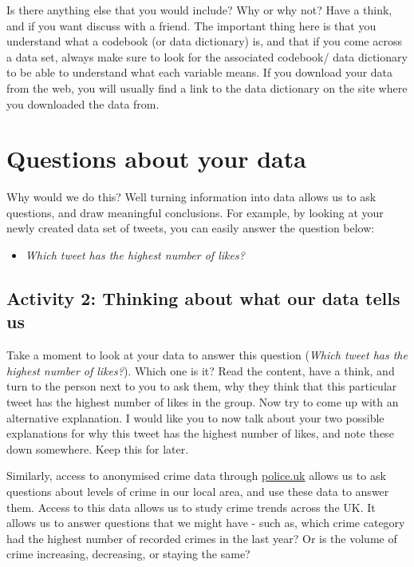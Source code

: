 \documentclass[]{book}
\providecommand{\tightlist}{%
  \setlength{\itemsep}{0pt}\setlength{\parskip}{0pt}}
\theoremstyle{definition}
\theoremstyle{definition}
\theoremstyle{definition}
\theoremstyle{remark}
\begin{document}
Is there anything else that you would include? Why or why not? Have a
think, and if you want discuss with a friend. The important thing here
is that you understand what a codebook (or data dictionary) is, and that
if you come across a data set, always make sure to look for the
associated codebook/ data dictionary to be able to understand what each
variable means. If you download your data from the web, you will usually
find a link to the data dictionary on the site where you downloaded the
data from.

\hypertarget{questions-about-your-data}{%
\section{Questions about your data}\label{questions-about-your-data}}

Why would we do this? Well turning information into data allows us to
ask questions, and draw meaningful conclusions. For example, by looking
at your newly created data set of tweets, you can easily answer the
question below:

\begin{itemize}
\tightlist
\item
  \emph{Which tweet has the highest number of likes?}
\end{itemize}

\hypertarget{activity-2-thinking-about-what-our-data-tells-us}{%
\subsection{Activity 2: Thinking about what our data tells
us}\label{activity-2-thinking-about-what-our-data-tells-us}}

Take a moment to look at your data to answer this question (\emph{Which
tweet has the highest number of likes?}). Which one is it? Read the
content, have a think, and turn to the person next to you to ask them,
why they think that this particular tweet has the highest number of
likes in the group. Now try to come up with an alternative explanation.
I would like you to now talk about your two possible explanations for
why this tweet has the highest number of likes, and note these down
somewhere. Keep this for later.

Similarly, access to anonymised crime data through
\href{www.police.uk}{police.uk} allows us to ask questions about levels
of crime in our local area, and use these data to answer them. Access to
this data allows us to study crime trends across the UK. It allows us to
answer questions that we might have - such as, which crime category had
the highest number of recorded crimes in the last year? Or is the volume
of crime increasing, decreasing, or staying the same?
\end{document}
